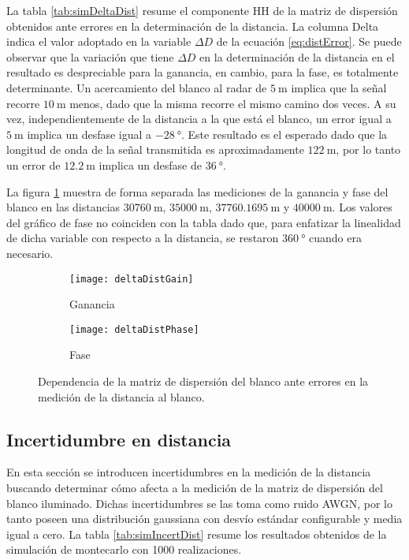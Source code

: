 La tabla \ref{tab:simDeltaDist} resume el componente HH de la matriz de dispersión obtenidos ante errores en la determinación de la distancia. La columna Delta indica el valor adoptado en la variable $\Delta D$ de la ecuación \ref{eq:distError}. Se puede observar que la variación que tiene $\Delta D$ en la determinación de la distancia en el resultado es despreciable para la ganancia, en cambio, para la fase, es totalmente determinante. Un acercamiento del blanco al radar de $\SI{5}{\meter}$ implica que la señal recorre $\SI{10}{\meter}$ menos, dado que la misma recorre el mismo camino dos veces. A su vez, independientemente de la distancia a la que está el blanco, un error igual a $\SI{5}{\meter}$ implica un desfase igual a $\SI{-28}{\degree}$. Este resultado es el esperado dado que la longitud de onda de la señal transmitida es aproximadamente $\SI{122}{\meter}$, por lo tanto un error de $\SI{12.2}{\meter}$ implica un desfase de $\SI{36}{\degree}$.

La figura \ref{fig:deltaDistSim} muestra de forma separada las mediciones de la ganancia y fase del blanco en las distancias $\SI{30760}{\meter}$, $\SI{35000}{\meter}$, $\SI{37760.1695}{\meter}$ y $\SI{40000}{\meter}$. Los valores del gráfico de fase no coinciden con la tabla dado que, para enfatizar la linealidad de dicha variable con respecto a la distancia, se restaron $\SI{360}{\degree}$ cuando era necesario.
\begin{figure}[H]
  \centering
  \begin{subfigure}{0.49\textwidth}
    \texttt{[image: deltaDistGain]}
    \caption{Ganancia}
  \end{subfigure}
  \begin{subfigure}{0.49\textwidth}
    \texttt{[image: deltaDistPhase]}
    \caption{Fase}
  \end{subfigure}
  \caption{Dependencia de la matriz de dispersión del blanco ante errores en la medición de la distancia al blanco.}
  \label{fig:deltaDistSim}
\end{figure}


\subsection{Incertidumbre en distancia}

En esta sección se introducen incertidumbres en la medición de la distancia buscando determinar cómo afecta a la medición de la matriz de dispersión del blanco iluminado. Dichas incertidumbres se las toma como ruido AWGN, por lo tanto poseen una distribución gaussiana con desvío estándar configurable y media igual a cero. La tabla \ref{tab:simIncertDist} resume los resultados obtenidos de la simulación de montecarlo con 1000 realizaciones.

